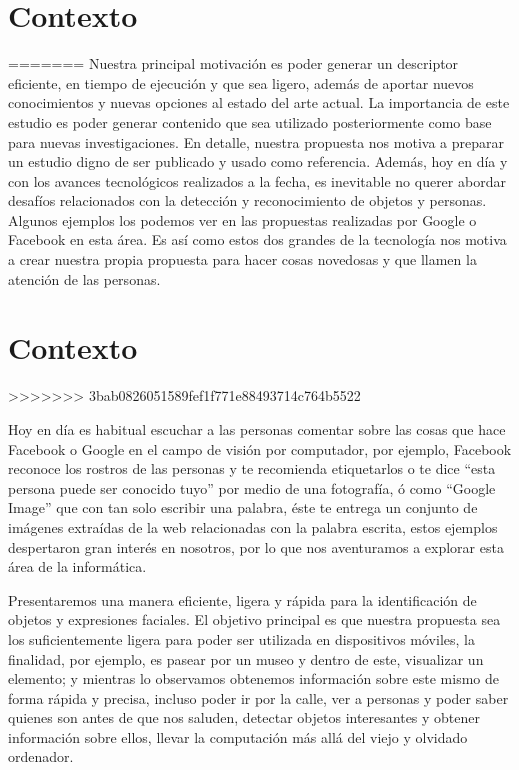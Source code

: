 \section{Contexto}\label{sub:Contexto}
=======
Nuestra principal motivación es poder generar un descriptor eficiente, en tiempo de ejecución y que sea ligero, además de aportar nuevos conocimientos y nuevas opciones al estado del arte actual. La importancia de este estudio es poder generar contenido que sea utilizado posteriormente como base para nuevas investigaciones. En detalle, nuestra propuesta nos motiva a preparar un estudio digno de ser publicado y usado como referencia. Además, hoy en día y con los avances tecnológicos realizados a la fecha, es inevitable no querer abordar desafíos relacionados con la detección y reconocimiento de objetos y personas. Algunos ejemplos los podemos ver en las propuestas realizadas por Google o Facebook en esta área. Es así como estos dos grandes de la tecnología nos motiva a crear nuestra propia propuesta para hacer cosas novedosas y que llamen la atención de las personas.

\section{Contexto}\label{chsub:Contexto}
>>>>>>> 3bab0826051589fef1f771e88493714c764b5522

Hoy en día es habitual escuchar a las personas comentar sobre las cosas que hace Facebook o Google en el campo de visión por computador, por ejemplo, Facebook reconoce los rostros de las personas y te recomienda etiquetarlos o te dice ``esta persona puede ser conocido tuyo'' por medio de una fotografía, ó como ``Google Image'' que con tan solo escribir una palabra, éste te entrega un conjunto de imágenes extraídas de la web relacionadas con la palabra escrita, estos ejemplos despertaron gran interés en nosotros, por lo que nos aventuramos a explorar esta área de la informática.

Presentaremos una manera eficiente, ligera y rápida para la identificación de objetos y expresiones faciales. El objetivo principal es que nuestra propuesta sea los suficientemente ligera para poder ser utilizada en dispositivos móviles, la finalidad, por ejemplo, es pasear por un museo y dentro de este, visualizar un elemento; y mientras lo observamos obtenemos información sobre este mismo de forma rápida y precisa, incluso poder ir por la calle, ver a personas y poder saber quienes son antes de que nos saluden, detectar objetos interesantes y obtener información sobre ellos, llevar la computación más allá del viejo y olvidado ordenador.

